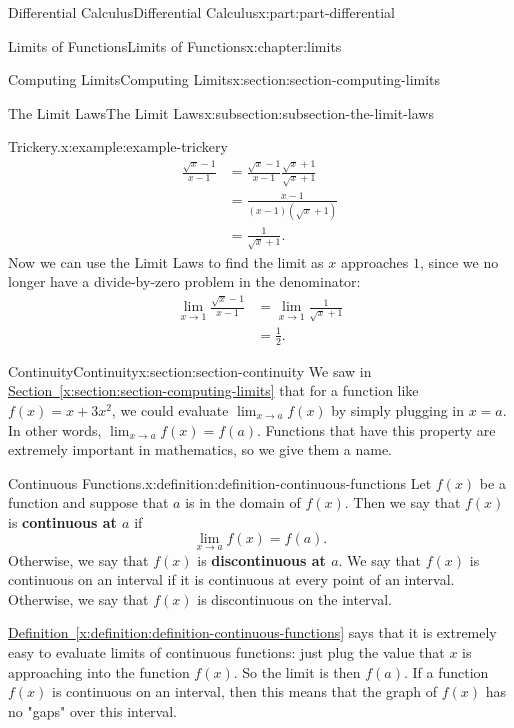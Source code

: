 \documentclass[twoside,10pt,]{book}
\newcommand{\xreffont}{\relax}
\newcommand{\terminology}[1]{\textbf{#1}}
\numberwithin{equation}{part}
\begin{document}
\begin{partptx}{Differential Calculus}{}{Differential Calculus}{}{}{x:part:part-differential}
\begin{chapterptx}{Limits of Functions}{}{Limits of Functions}{}{}{x:chapter:limits}
\begin{sectionptx}{Computing Limits}{}{Computing Limits}{}{}{x:section:section-computing-limits}
\begin{subsectionptx}{The Limit Laws}{}{The Limit Laws}{}{}{x:subsection:subsection-the-limit-laws}
\begin{example}{Trickery.}{x:example:example-trickery}
%
\begin{align*}
\frac{\sqrt{x}-1}{x-1} & = \frac{\sqrt{x}-1}{x-1}\frac{\sqrt{x}+1}{\sqrt{x}+1} \\
& = \frac{x - 1}{(x-1)(\sqrt{x}+1)} \\
& = \frac{1}{\sqrt{x}+1}. 
\end{align*}
Now we can use the Limit Laws to find the limit as \(x\) approaches \(1\), since we no longer have a divide-by-zero problem in the denominator:%
%
\begin{align*}
\lim_{x\to1}\frac{\sqrt{x}-1}{x-1} & = \lim_{x\to1}\frac{1}{\sqrt{x}+1} \\
& = \frac{1}{2}. 
\end{align*}
\end{example}
\end{subsectionptx}
\end{sectionptx}
%
%
\typeout{************************************************}
\typeout{************************************************}
%
\begin{sectionptx}{Continuity}{}{Continuity}{}{}{x:section:section-continuity}
We saw in \hyperref[x:section:section-computing-limits]{Section~{\xreffont\ref{x:section:section-computing-limits}}} that for a function like \(f(x) = x+3x^{2}\), we could evaluate \(\lim_{x\to a}f(x)\) by simply plugging in \(x=a\). In other words, \(\lim_{x\to a}f(x) = f(a)\). Functions that have this property are extremely important in mathematics, so we give them a name.%
\begin{definition}{Continuous Functions.}{x:definition:definition-continuous-functions}%
%
Let \(f(x)\) be a function and suppose that \(a\) is in the domain of \(f(x)\). Then we say that \(f(x)\) is \terminology{continuous at \(a\)} if%
\begin{equation*}
\lim_{x\to a}f(x) = f(a)\text{.}
\end{equation*}
Otherwise, we say that \(f(x)\) is \terminology{discontinuous at \(a\)}. We say that \(f(x)\) is continuous on an interval if it is continuous at every point of an interval. Otherwise, we say that \(f(x)\) is discontinuous on the interval.%
\end{definition}
\hyperref[x:definition:definition-continuous-functions]{Definition~{\xreffont\ref{x:definition:definition-continuous-functions}}} says that it is extremely easy to evaluate limits of continuous functions: just plug the value that \(x\) is approaching into the function \(f(x)\). So the limit is then \(f(a)\). If a function \(f(x)\) is continuous on an interval, then this means that the graph of \(f(x)\) has no "gaps" over this interval.%

\end{sectionptx}
\end{chapterptx}
\end{partptx}
\end{document}
